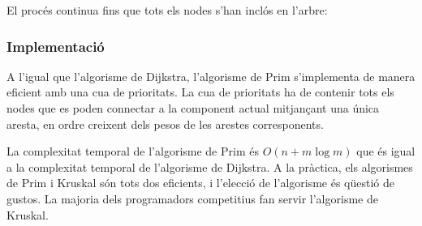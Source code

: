 \begin{samepage}
El procés continua fins que tots els nodes s’han inclós en l’arbre:
\begin{center}
\end{center}
\end{samepage}


\subsubsection{Implementació}

A l'igual que l'algorisme de Dijkstra, l'algorisme de Prim
s'implementa de manera eficient amb una cua de prioritats. La cua de
prioritats ha de contenir tots els nodes que es poden connectar a la
component actual mitjançant una única aresta, en ordre creixent dels
pesos de les arestes corresponents.

La complexitat temporal de l'algorisme de Prim és $O(n + m \log m)$
que és igual a la complexitat temporal de l'algorisme de Dijkstra. A
la pràctica, els algorismes de Prim i Kruskal són tots dos eficients,
i l'elecció de l'algorisme és qüestió de gustos. La majoria dels
programadors competitius fan servir l'algorisme de Kruskal.


